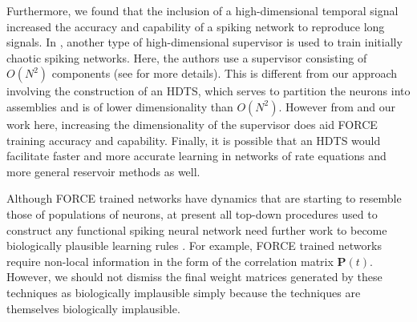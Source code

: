 \documentclass[11pt]{article} %
\begin{document}
Furthermore, we found that the inclusion of a high-dimensional temporal signal increased the accuracy and capability of a spiking network to reproduce long signals.  In \cite{FORCE2}, another type of high-dimensional supervisor is used to train initially chaotic spiking networks.  Here, the authors use a supervisor consisting of $O(N^2)$ components (see \cite{FORCE2} for more details).  This is different from our approach involving the construction of an HDTS, which serves to partition the neurons into assemblies and is of lower dimensionality than $O(N^2)$.  However from \cite{FORCE2} and our work here, increasing the dimensionality of the supervisor does aid FORCE training accuracy and capability.  Finally, it is possible that an HDTS would facilitate faster and more accurate learning in networks of rate equations and more general reservoir methods as well.  

Although FORCE trained networks have dynamics that are starting to resemble those of populations of neurons, at present all top-down procedures used to construct any functional spiking neural network need further work to become biologically plausible learning rules \cite{FORCE1,Deneve1,Chris1}.  For example, FORCE trained networks require non-local information in the form of the correlation matrix $\bm P(t)$.    However, we should not dismiss the final weight matrices generated by these techniques as biologically implausible simply because the techniques are themselves biologically implausible.  

\end{document}
